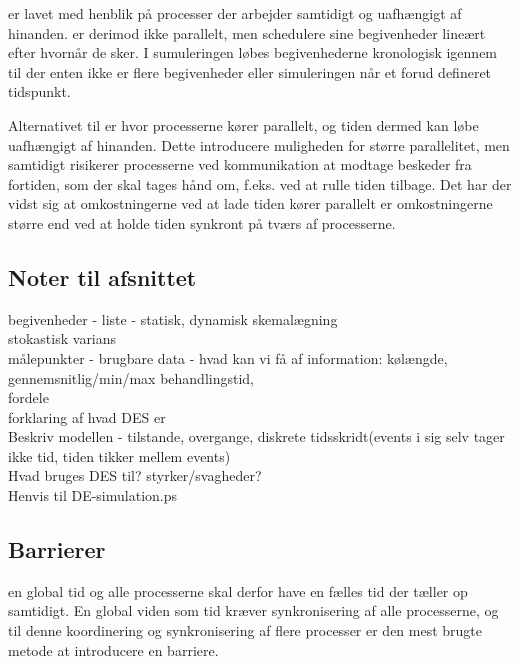     
\csp er lavet med henblik på processer der arbejder samtidigt og uafhængigt af hinanden. \Des er derimod ikke parallelt, men schedulere sine begivenheder lineært efter hvornår de sker. I sumuleringen løbes begivenhederne kronologisk igennem til der enten ikke er flere begivenheder eller simuleringen når et forud defineret tidspunkt.

Alternativet til  \des  er \pdes{} hvor processerne kører parallelt, og  tiden dermed kan løbe uafhængigt af hinanden. Dette introducere muligheden for større parallelitet, men samtidigt risikerer processerne ved kommunikation at modtage beskeder fra fortiden, som der skal tages hånd om, f.eks. ved at rulle tiden tilbage. Det har der vidst sig at omkostningerne ved at lade tiden kører parallelt er omkostningerne større end ved at holde tiden synkront på tværs af processerne.
    

\subsection*{Noter til afsnittet}
begivenheder - liste - statisk, dynamisk skemalægning \\
stokastisk varians\\
målepunkter - brugbare data - hvad kan vi få af information: kølængde, gennemsnitlig/min/max behandlingstid, \\
fordele\\
forklaring af hvad DES er\\
Beskriv modellen - tilstande, overgange, diskrete tidsskridt(events i sig selv tager ikke tid, tiden tikker mellem events)\\
Hvad bruges DES til? styrker/svagheder?\\
Henvis til DE-simulation.ps\\

\subsection{Barrierer} \label{sec:barrierer}
  en 
global tid og alle processerne skal derfor have en fælles tid der tæller op 
samtidigt.  En global viden som tid kræver synkronisering af alle 
processerne, og til denne koordinering og synkronisering af flere 
processer er den mest brugte metode at introducere en barriere.

